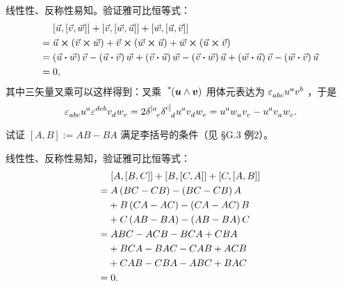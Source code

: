 \begin{xiti}
    \begin{zm}
    	线性性、反称性易知。验证雅可比恒等式：
    	\begin{align*}
    	&\tmu \left[\myvec{u},\left[\myvec{v},\myvec{w}\right]\right] + \left[\myvec{v},\left[\myvec{w},\myvec{u}\right]\right] + \left[\myvec{w},\left[\myvec{u},\myvec{v}\right]\right]\\
    	=&\;\myvec{u} \cp \left( \myvec{v} \cp \myvec{w} \right) + \myvec{v} \cp \left( \myvec{w} \cp \myvec{u} \right) + \myvec{w} \cp \left( \myvec{u} \cp \myvec{v} \right)\\
    	=&\tmu\left(\myvec{u} \vdot \myvec{w}\right) \myvec{v} - \left(\myvec{u} \vdot \myvec{v}\right) \myvec{w} + \left(\myvec{v} \vdot \myvec{u}\right) \myvec{w} - \left(\myvec{v} \vdot \myvec{w}\right) \myvec{u} + \left(\myvec{w} \vdot \myvec{u}\right) \myvec{v} - \left(\myvec{w} \vdot \myvec{v}\right) \myvec{u}\\
    	=&\;0,
    	\end{align*}
    	其中三矢量叉乘可以这样得到：叉乘 $\tensor[^*]{\left(\bm{u}\wedge\bm{v}\right)}{}$ 用体元表达为 $\tensor{\varepsilon}{_a_b_c} \tensor{u}{^a} \tensor{v}{^b}$ ，于是
    	\begin{displaymath}
    	\tensor{\varepsilon}{_a_b_c} \tensor{u}{^a} \tensor{\varepsilon}{^d^e^b} \tensor{v}{_d} \tensor{w}{_e} = 2 \tensor{\delta}{^{[a}_e} \tensor{\delta}{^{c]}_d} \tensor{u}{^a} \tensor{v}{_d} \tensor{w}{_e} = \tensor{u}{^a} \tensor{w}{_a} \tensor{v}{_c} - \tensor{u}{^a} \tensor{v}{_a} \tensor{w}{_c}.
    	\end{displaymath}
    \end{zm}

    \item 试证 $\left[A,B\right] := AB-BA$ 满足李括号的条件（见 \S G.3 例2）。

    \begin{zm}
    	线性性、反称性易知，验证雅可比恒等式：
    	\begin{align*}
    	&\mspace{2mu}\left[A,\left[B,C\right]\right] + \left[B,\left[C,A\right]\right] + \left[C,\left[A,B\right]\right]\\
    	=&\;A \left(BC-CB\right) - \left(BC-CB\right) A \\
    	&+ B \left(CA-AC\right) - \left(CA-AC\right) B \\
    	&+ C \left(AB-BA\right) - \left(AB-BA\right) C\\
    	=&\;ABC-ACB-BCA+CBA\\
    	&+ BCA-BAC-CAB+ACB\\
    	&+CAB-CBA-ABC+BAC\\
    	=&\;0.
    	\end{align*}
    \end{zm}


\end{xiti}
